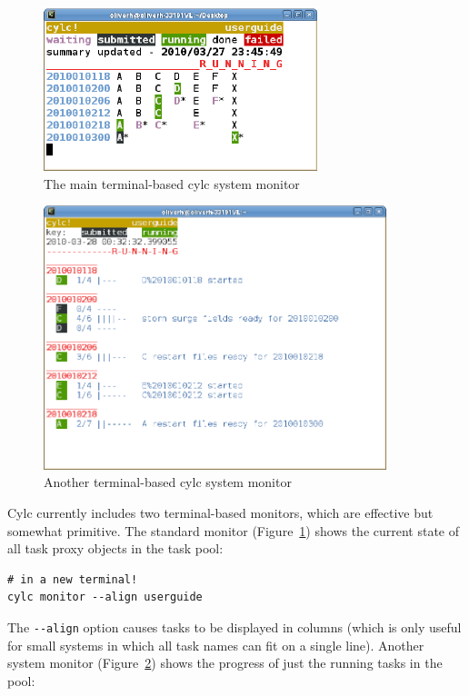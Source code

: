 \documentclass[11pt,a4paper]{article}
\begin{document}
\begin{figure}
    \begin{center}
        \includegraphics[width=8cm]{monitor-1} 
    \end{center}
    \caption{\small The main terminal-based cylc system monitor}
    \label{fig-monitor} 
\end{figure} 

\begin{figure}
    \begin{center}
        \includegraphics[width=10cm]{monitor-2} 
    \end{center}
    \caption{\small Another terminal-based cylc system monitor}
    \label{fig-monitor-r} 
\end{figure} 


Cylc currently includes two terminal-based monitors, which are effective
but somewhat primitive.  The standard monitor (Figure~\ref{fig-monitor})
shows the current state of all task proxy objects in the task pool:

\begin{lstlisting}
# in a new terminal!
cylc monitor --align userguide
\end{lstlisting}

The \lstinline=--align= option causes tasks to be displayed in columns
(which is only useful for small systems in which all task names can fit
on a single line).  Another system monitor (Figure~\ref{fig-monitor-r})
shows the progress of just the running tasks in the pool:
\end{document}
